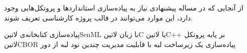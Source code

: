 
از آنجایی که در مساله پیشنهادی نیاز به پیاده‌سازی استانداردها و پروتکل‌هایی وجود دارد، این موارد می‌توانند در قالب پروژه کارشناسی تعریف شوند.

 پیاده‌سازی کتابخانه‌ی ‌لاتین{SenML} با زبان ‌لاتین{C} یا ‌لاتین{C++} بر پایه پروتکل ‌لاتین{CBOR}
 پیاده‌سازی یک زیرساخت لبه با قابلیت مدیریت چندین نود لبه از دور
